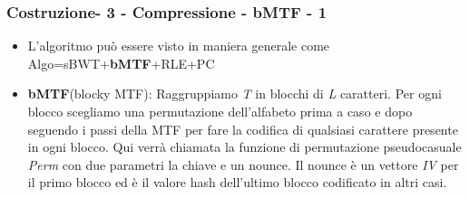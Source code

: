 \documentclass{beamer}
\begin{document}
\begin{frame}
\frametitle{Costruzione- 3 - Compressione - bMTF - 1}
	\begin{itemize}
		\item L’algoritmo può essere visto in maniera generale come Algo=sBWT+\textbf{bMTF}+RLE+PC\pause
		\item \textbf{bMTF}(blocky MTF): Raggruppiamo \textit{T} in blocchi di \textit{L} caratteri. Per ogni blocco scegliamo una permutazione dell’alfabeto prima a caso e dopo seguendo i passi della MTF per fare la codifica di qualsiasi carattere presente in ogni blocco. Qui verrà chiamata la funzione di permutazione pseudocasuale \textit{Perm} con due parametri la chiave e un nounce. Il nounce è un vettore \textit{IV} per il primo blocco ed è il valore hash dell’ultimo blocco codificato in altri casi.
		
	\end{itemize}
\end{frame}
\end{document}
